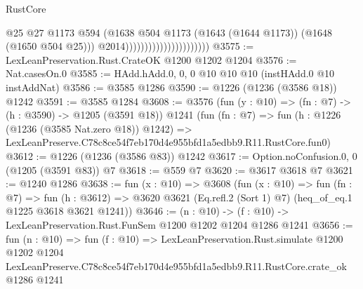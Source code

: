 \begin{lexlean}{RustCore}
\begin{coremodule}
                                                @25
                                                @27
                                                @1173
                                                @594
                                                (@1638
                                                  @504
                                                  @1173
                                                  (@1643 (@1644 @1173))
                                                  (@1648 (@1650 @504 @25)))
                                                @2014))))))))))))))))))))))
@3575 := LexLeanPreservation.Rust.CrateOK @1200 @1202 @1204
@3576 := Nat.casesOn.{0}
@3585 := HAdd.hAdd.{0, 0, 0} @10 @10 @10 (instHAdd.{0} @10 instAddNat)
@3586 := @3585 @1286
@3590 := @1226 (@1236 (@3586 @18)) @1242
@3591 := @3585 @1284
@3608 := @3576
    (fun (y : @10) => (fn : @7) -> (h : @3590) -> @1205 (@3591 @18))
    @1241
    (fun (fn : @7) =>
    fun (h : @1226 (@1236 (@3585 Nat.zero @18)) @1242) =>
    LexLeanPreserve.C78c8ce54f7eb170d4e955bfd1a5edbb9.R11.RustCore.fun0)
@3612 := @1226 (@1236 (@3586 @83)) @1242
@3617 := Option.noConfusion.{0, 0} (@1205 (@3591 @83)) @7
@3618 := @559 @7
@3620 := @3617 @3618 @7
@3621 := @1240 @1286
@3638 := fun (x : @10) =>
  @3608
    (fun (x : @10) =>
    fun (fn : @7) =>
    fun (h : @3612) =>
    @3620 @3621 (Eq.refl.{2} (Sort 1) @7) (heq_of_eq.{1} @1225 @3618 @3621 @1241))
@3646 := (n : @10) -> (f : @10) -> LexLeanPreservation.Rust.FunSem @1200 @1202 @1204 @1286 @1241
@3656 := fun (n : @10) =>
  fun (f : @10) =>
  LexLeanPreservation.Rust.simulate
    @1200
    @1202
    @1204
    LexLeanPreserve.C78c8ce54f7eb170d4e955bfd1a5edbb9.R11.RustCore.crate_ok
    @1286
    @1241
\end{coremodule}
\end{lexlean}
